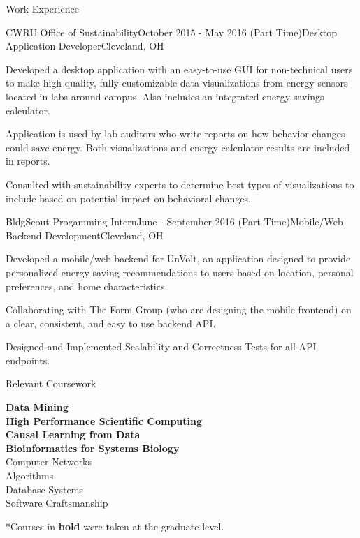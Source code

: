\documentclass{resume} %
\begin{document}
\begin{rSection}{Work Experience}
\begin{rSubsection}{CWRU Office of Sustainability}{October 2015 - May 2016 (Part Time)}{Desktop Application Developer}{Cleveland, OH}
\item Developed a desktop application with an easy-to-use GUI for non-technical users to make high-quality, fully-customizable data visualizations from energy sensors located in labs around campus. Also includes an integrated energy savings calculator.
\item Application is used by lab auditors who write reports on how behavior changes could save energy. Both visualizations and energy calculator results are included in reports.
\item Consulted with sustainability experts to determine best types of visualizations to include based on potential impact on behavioral changes.
\end{rSubsection}

\begin{rSubsection}{BldgScout Progamming Intern}{June - September 2016 (Part Time)}{Mobile/Web Backend Development}{Cleveland, OH}
\item Developed a mobile/web backend for UnVolt, an application designed to provide personalized energy saving recommendations to users based on location, personal preferences, and home characteristics.
\item Collaborating with The Form Group (who are designing the mobile frontend) on a clear, consistent, and easy to use backend API.
\item Designed and Implemented Scalability and Correctness Tests for all API endpoints.

\end{rSubsection}

\end{rSection}


\begin{rSection}{Relevant Coursework}
\begin{multicols}{2}[]
\textbf{Data Mining} \\
\textbf{High Performance Scientific Computing} \\
\textbf{Causal Learning from Data} \\
\textbf{Bioinformatics for Systems Biology} \\ 
Computer Networks \\
Algorithms \\
Database Systems \\
Software Craftsmanship
\end{multicols}
\vspace{-1.0em}
*Courses in \textbf{bold} were taken at the graduate level.
\end{rSection}
\end{document}
